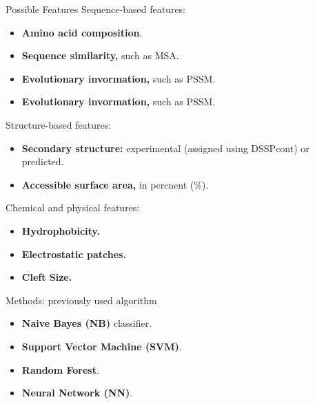 \documentclass[pdf]
{beamer}
\begin{document}
\begin{frame}{Possible Features}
	Sequence-based features:
	\begin{itemize}
		\item \textbf{Amino acid composition}.
		\item \textbf{Sequence similarity,} such as MSA.
		\item \textbf{Evolutionary invormation,} such as PSSM. 
		\item \textbf{Evolutionary invormation,} such as PSSM. 
	\end{itemize}
	Structure-based features:
	\begin{itemize}
		\item \textbf{Secondary structure:} experimental (assigned using DSSPcont) or predicted.
		\item \textbf{Accessible surface area,} in percnent (\%).
	\end{itemize}
	Chemical and physical features:
	\begin{itemize}
		\item \textbf{Hydrophobicity.}
		\item \textbf{Electrostatic patches.}
		\item \textbf{Cleft Size.}
	\end{itemize}
\end{frame}

\begin{frame}{Methods: previously used algorithm}
	\begin{itemize}
		\item \textbf{Naive Bayes (NB)} classifier.
		\item \textbf{Support Vector Machine (SVM)}.
		\item \textbf{Random Forest}.
		\item \textbf{Neural Network (NN)}.
	\end{itemize}
\end{frame}
\end{document}
